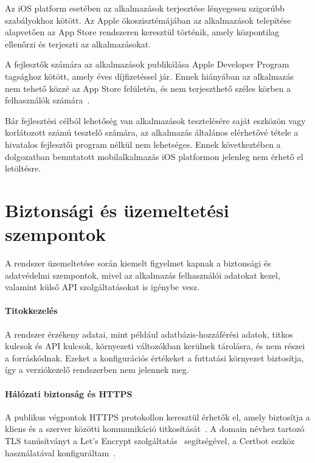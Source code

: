 \documentclass[
]{thesis-ekf}
\theoremstyle{definition}
\theoremstyle{remark}
\begin{document}
Az iOS platform esetében az alkalmazások terjesztése lényegesen szigorúbb szabályokhoz kötött. Az Apple ökoszisztémájában az alkalmazások telepítése alapvetően az App Store rendszeren keresztül történik, amely központilag ellenőrzi és terjeszti az alkalmazásokat.

A fejlesztők számára az alkalmazások publikálása Apple Developer Program tagsághoz kötött, amely éves díjfizetéssel jár. Ennek hiányában az alkalmazás nem tehető közzé az App Store felületén, és nem terjeszthető széles körben a felhasználók számára~\cite{apple_app_store_distribution, apple_developer_program}.

Bár fejlesztési célból lehetőség van alkalmazások tesztelésére saját eszközön vagy korlátozott számú tesztelő számára, az alkalmazás általános elérhetővé tétele a hivatalos fejlesztői program nélkül nem lehetséges. Ennek következtében a dolgozatban bemutatott mobilalkalmazás iOS platformon jelenleg nem érhető el letöltésre.

\section{Biztonsági és üzemeltetési szempontok}

A rendszer üzemeltetése során kiemelt figyelmet kapnak a biztonsági és adatvédelmi szempontok, mivel az alkalmazás felhasználói adatokat kezel, valamint külső API szolgáltatásokat is igénybe vesz.

\paragraph{Titokkezelés}

A rendszer érzékeny adatai, mint például adatbázis-hozzáférési adatok, titkos kulcsok és API kulcsok, környezeti változókban kerülnek tárolásra, és nem részei a forráskódnak. Ezeket a konfigurációs értékeket a futtatási környezet biztosítja, így a verziókezelő rendszerben nem jelennek meg.

\paragraph{Hálózati biztonság és HTTPS}

A publikus végpontok HTTPS protokollon keresztül érhetők el, amely biztosítja a kliens és a szerver közötti kommunikáció titkosítását~\cite{rfc8446}. A domain névhez tartozó TLS tanúsítványt a Let's Encrypt szolgáltatás~\cite{letsencrypt} segítségével, a Certbot eszköz használatával konfiguráltam~\cite{certbot}.
\end{document}
